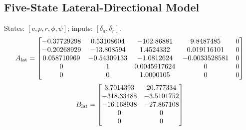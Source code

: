 \documentclass[a4paper,11pt]{article}
\begin{document}
\subsection{Five-State Lateral-Directional Model}
States: $[v,p,r,\phi,\psi]$; inputs: $[\delta_a,\delta_r]$.
\begin{equation}\resizebox{0.95\linewidth}{!}{$A_{\rm lat}=\begin{bmatrix}
-0.37729298 & 0.53108604 & -102.86881 & 9.8487485 & 0 \\
-0.20268929 & -13.808594 & 1.4524332 & 0.019116101 & 0 \\
0.058710969 & -0.54309133 & -1.0812624 & -0.0033528581 & 0 \\
0 & 1 & 0.0045917624 & 0 & 0 \\
0 & 0 & 1.0000105 & 0 & 0 \\
\end{bmatrix}$}\end{equation}
\begin{equation}B_{\rm lat}=\begin{bmatrix}
3.7014393 & 20.777334 \\
-318.33488 & -3.5101752 \\
-16.168938 & -27.867108 \\
0 & 0 \\
0 & 0 \\
\end{bmatrix}\end{equation}

\clearpage
\end{document}
